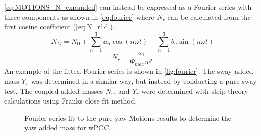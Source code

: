 \autoref{eq:MOTIONS_N_expanded} can instead be expressed as a Fourier series with three components as shown in \autoref{eq:fourier} where $N_{\dot{r}}$ can be calculated from the first cosine coefficient (\autoref{eq:N_r1d}).
\begin{equation}
    N_M = N_0 + \sum_{n=1}^3a_n \cos(n \omega t) + \sum_{n=1}^3b_n \sin(n \omega t) 
    \label{eq:fourier}
\end{equation}
\begin{equation}
    N_{\dot{r}} = \frac{a_1}{\Psi_{max} w^{2}}
    \label{eq:N_r1d}
\end{equation}
An example of the fitted Fourier series is shown in \autoref{fig:fourier}. The sway added mass $Y_{\dot{v}}$ was determined in a similar way, but instead by conducting a pure sway test. The coupled added masses $N_{\dot{v}}$, and $Y_{\dot{r}}$ were determined with strip theory calculations using Franks close fit method.
\begin{figure}[h]
    \centering
    
    \caption{Fourier series fit to the pure yaw Motions results to determine the yaw added mass for wPCC.}
    \label{fig:fourier}
\end{figure}